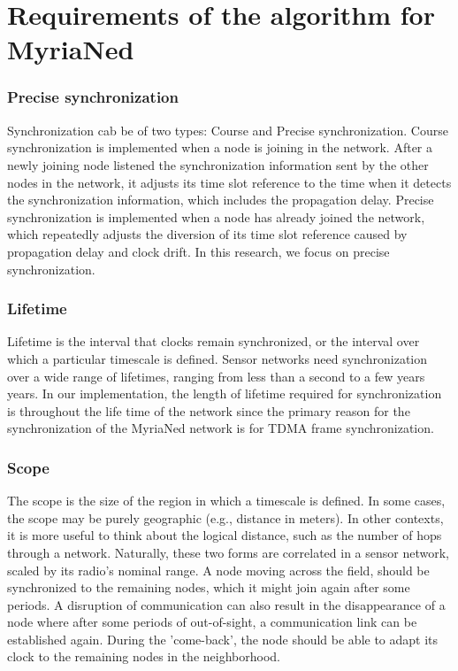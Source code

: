 \documentclass[a4paper,10pt]{report}
\begin{document}
\section{\textbf{Requirements of the algorithm for MyriaNed}}
\subsubsection{\textbf{Precise synchronization}}
Synchronization cab be of two types: Course and Precise synchronization. Course synchronization is implemented when a node is joining in the network. After a newly joining node listened the synchronization information sent by the other nodes in the network, it adjusts its time slot reference to the time when it detects the synchronization information, which includes the propagation delay. Precise synchronization is implemented when a node has already joined the network, which repeatedly adjusts the diversion of its time slot reference caused by propagation delay and clock drift. In this research, we focus on precise synchronization.
\subsubsection{\textbf{Lifetime}} Lifetime is the interval that clocks remain synchronized, or the interval over which a particular
timescale is defined. Sensor networks need synchronization over a wide range of lifetimes, ranging from less than a second to a few years
years. In our implementation, the length of lifetime required for synchronization is throughout the life time of the network since
the primary reason for the synchronization of the MyriaNed network is for TDMA frame synchronization.
\subsubsection{\textbf{Scope}} The scope is the size of the region in which a timescale is defined. In some cases, the scope may be purely
geographic (e.g., distance in meters). In other contexts, it is more useful to think about the logical distance, such as the number of
hops through a network. Naturally, these two forms are correlated in a sensor network, scaled by its radio's nominal range. A node moving across the field, should be synchronized to the remaining nodes, which it might join again after some periods. A disruption of communication can also result in the disappearance of a node where after some periods of out-of-sight, a communication link can be established again. During the 'come-back', the node should be able to adapt its clock to the remaining nodes in the neighborhood.
\end{document}
